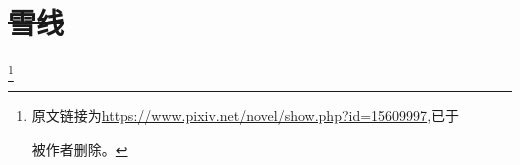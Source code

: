 \chapter{\sout{雪线}}

\footnote{原文链接为\url{https://www.pixiv.net/novel/show.php?id=15609997},已于\date{2022-05-31}被作者删除。}


